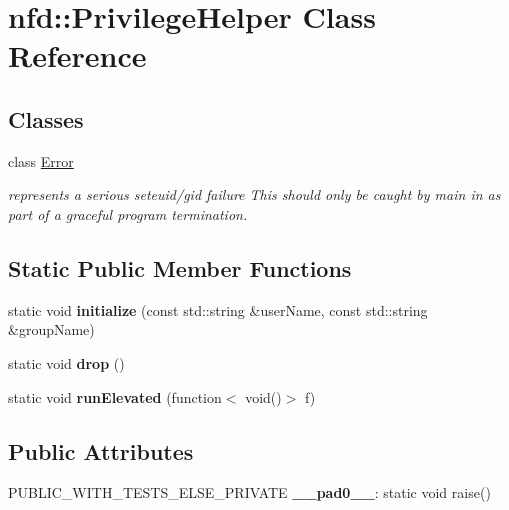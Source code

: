 \hypertarget{classnfd_1_1PrivilegeHelper}{}\section{nfd\+:\+:Privilege\+Helper Class Reference}
\label{classnfd_1_1PrivilegeHelper}
\subsection*{Classes}
\begin{DoxyCompactItemize}
\item 
class \hyperlink{classnfd_1_1PrivilegeHelper_1_1Error}{Error}
\begin{DoxyCompactList}\small\item\em represents a serious seteuid/gid failure  This should only be caught by main in as part of a graceful program termination. \end{DoxyCompactList}\end{DoxyCompactItemize}
\subsection*{Static Public Member Functions}
\begin{DoxyCompactItemize}
\item 
static void {\bfseries initialize} (const std\+::string \&user\+Name, const std\+::string \&group\+Name)\hypertarget{classnfd_1_1PrivilegeHelper_a88a36e9cb75661fba83202b5c7660441}{}\label{classnfd_1_1PrivilegeHelper_a88a36e9cb75661fba83202b5c7660441}

\item 
static void {\bfseries drop} ()\hypertarget{classnfd_1_1PrivilegeHelper_a8203b6dbb7683cb30dc8c8bde357f45f}{}\label{classnfd_1_1PrivilegeHelper_a8203b6dbb7683cb30dc8c8bde357f45f}

\item 
static void {\bfseries run\+Elevated} (function$<$ void()$>$ f)\hypertarget{classnfd_1_1PrivilegeHelper_a5f3bb11af5a959f43f45e7626e67306f}{}\label{classnfd_1_1PrivilegeHelper_a5f3bb11af5a959f43f45e7626e67306f}

\end{DoxyCompactItemize}
\subsection*{Public Attributes}
\begin{DoxyCompactItemize}
\item 
P\+U\+B\+L\+I\+C\+\_\+\+W\+I\+T\+H\+\_\+\+T\+E\+S\+T\+S\+\_\+\+E\+L\+S\+E\+\_\+\+P\+R\+I\+V\+A\+TE {\bfseries \+\_\+\+\_\+pad0\+\_\+\+\_\+}\+: static void raise()\hypertarget{classnfd_1_1PrivilegeHelper_a26885ee3e92f25d012a492f16c2b1c74}{}\label{classnfd_1_1PrivilegeHelper_a26885ee3e92f25d012a492f16c2b1c74}

\end{DoxyCompactItemize}


